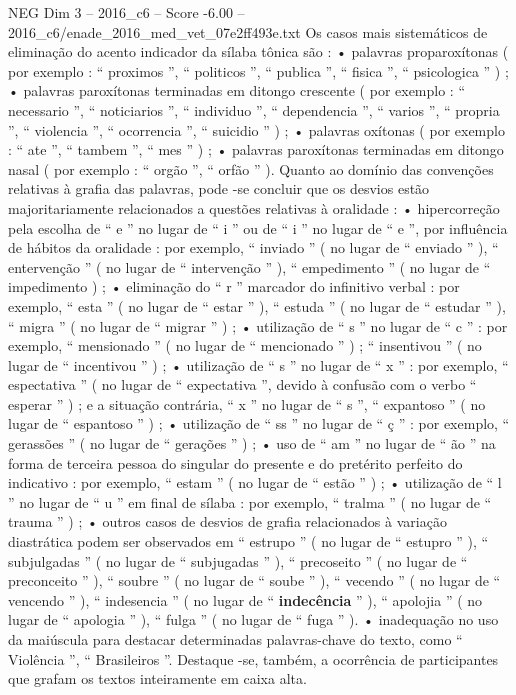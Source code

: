 \begin{textsample}{NEG Dim 3 – 2016\_c6 – Score -6.00 – 2016\_c6/enade\_2016\_med\_vet\_07e2ff493e.txt}
Os casos mais sistemáticos de eliminação do acento indicador da sílaba tônica são : • palavras proparoxítonas ( por exemplo : “ proximos ”, “ politicos ”, “ publica ”, “ fisica ”, “ psicologica ” ) ; • palavras paroxítonas terminadas em ditongo crescente ( por exemplo : “ necessario ”, “ noticiarios ”, “ individuo ”, “ dependencia ”, “ varios ”, “ propria ”, “ violencia ”, “ ocorrencia ”, “ suicidio ” ) ; • palavras oxítonas ( por exemplo : “ ate ”, “ tambem ”, “ mes ” ) ; • palavras paroxítonas terminadas em ditongo nasal ( por exemplo : “ orgão ”, “ orfão ” ).
Quanto ao domínio das convenções relativas à grafia das palavras, pode -se concluir que os desvios estão majoritariamente relacionados a questões relativas à oralidade : • hipercorreção pela escolha de “ e ” no lugar de “ i ” ou de “ i ” no lugar de “ e ”, por influência de hábitos da oralidade : por exemplo, “ inviado ” ( no lugar de “ enviado ” ), “ entervenção ” ( no lugar de “ intervenção ” ), “ empedimento ” ( no lugar de “ impedimento ) ; • eliminação do “ r ” marcador do infinitivo verbal : por exemplo, “ esta ” ( no lugar de “ estar ” ), “ estuda ” ( no lugar de “ estudar ” ), “ migra ” ( no lugar de “ migrar ” ) ; • utilização de “ s ” no lugar de “ c ” : por exemplo, “ mensionado ” ( no lugar de “ mencionado ” ) ; “ insentivou ” ( no lugar de “ incentivou ” ) ; • utilização de “ s ” no lugar de “ x ” : por exemplo, “ espectativa ” ( no lugar de “ expectativa ”, devido à confusão com o verbo “ esperar ” ) ; e a situação contrária, “ x ” no lugar de “ s ”, “ expantoso ” ( no lugar de “ espantoso ” ) ; • utilização de “ ss ” no lugar de “ ç ” : por exemplo, “ gerassões ” ( no lugar de “ gerações ” ) ; • uso de “ am ” no lugar de “ ão ” na forma de terceira pessoa do singular do presente e do pretérito perfeito do indicativo : por exemplo, “ estam ” ( no lugar de “ estão ” ) ; • utilização de “ l ” no lugar de “ u ” em final de sílaba : por exemplo, “ tralma ” ( no lugar de “ trauma ” ) ; • outros casos de desvios de grafia relacionados à variação diastrática podem ser observados em “ estrupo ” ( no lugar de “ estupro ” ), “ subjulgadas ” ( no lugar de “ subjugadas ” ), “ precoseito ” ( no lugar de “ preconceito ” ), “ soubre ” ( no lugar de “ soube ” ), “ vecendo ” ( no lugar de “ vencendo ” ), “ indesencia ” ( no lugar de “ \textbf{indecência} ” ), “ apolojia ” ( no lugar de “ apologia ” ), “ fulga ” ( no lugar de “ fuga ” ). • inadequação no uso da maiúscula para destacar determinadas palavras-chave do texto, como “ Violência ”, “ Brasileiros ”.
Destaque -se, também, a ocorrência de participantes que grafam os textos inteiramente em caixa alta.

\end{textsample}
